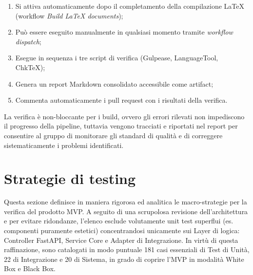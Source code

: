 \documentclass[a4paper,11pt,oneside]{scrartcl}
\begin{document}
\begin{enumerate}
    \item Si attiva automaticamente dopo il completamento della compilazione \LaTeX{} (workflow \textit{Build LaTeX documents});
    \item Può essere eseguito manualmente in qualsiasi momento tramite \textit{workflow dispatch};
    \item Esegue in sequenza i tre script di verifica (Gulpease, LanguageTool, ChkTeX);
    \item Genera un report Markdown consolidato accessibile come artifact;
    \item Commenta automaticamente i pull request con i risultati della verifica.
\end{enumerate}

La verifica è non-bloccante per i build, ovvero gli errori rilevati non impediscono il progresso della pipeline, tuttavia vengono tracciati e riportati nel report per consentire al gruppo di monitorare gli standard di qualità e di correggere sistematicamente i problemi identificati.

\section{Strategie di testing}

Questa sezione definisce in maniera rigorosa ed analitica le macro-strategie per la verifica del prodotto MVP. A seguito di una scrupolosa revisione dell'architettura e per evitare ridondanze, l'elenco esclude volutamente unit test superflui (es. componenti puramente estetici) concentrandosi unicamente sui Layer di logica: Controller FastAPI, Service Core e Adapter di Integrazione. In virtù di questa raffinazione, sono catalogati in modo puntuale 181 casi essenziali di Test di Unità, 22 di Integrazione e 20 di Sistema, in grado di coprire l'MVP in modalità White Box e Black Box.
\end{document}

